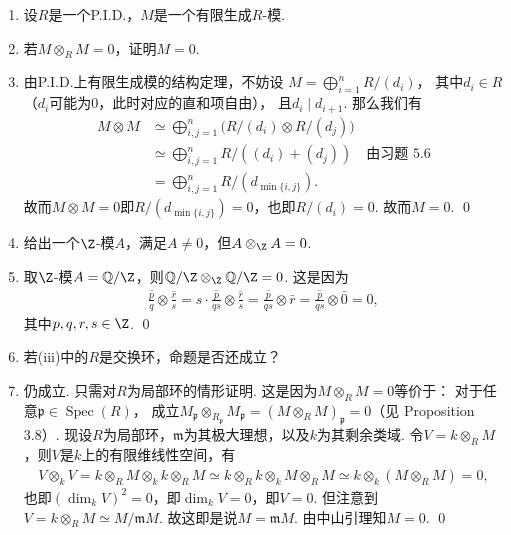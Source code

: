 \begin{enumerate}
    \item[5.3] 设$R$是一个P.I.D.，$M$是一个有限生成$R$-模.
    \item[(i)]
        若$M \otimes_{R} M = 0$，证明$M=0$.
    \item[\textbf{证明:}]
        由P.I.D.上有限生成模的结构定理，不妨设
        $M = \bigoplus\limits_{i=1}^{n} R/(d_{i})$，
        其中$d_{i} \in R$（$d_{i}$可能为$0$，此时对应的直和项自由），
        且$d_{i} \mid d_{i+1}$. 那么我们有
        \[\begin{aligned}
            M \otimes M &\simeq \bigoplus_{i,j=1}^{n}
            \big(R/(d_{i}) \otimes R/(d_{j})\big)\\
            &\simeq \bigoplus_{i,j=1}^{n}R/((d_{i})+(d_{j})) \quad\text{由习题 5.6}\\
            &= \bigoplus_{i,j=1}^{n}R/(d_{\min\{i,j\}}).
        \end{aligned}\]
        故而$M \otimes M = 0$即$R/(d_{\min\{i,j\}}) = 0$，也即$R/(d_{i}) = 0$. 故而$M=0$. \qed
    \item[(ii)] 
        给出一个$\Z$-模$A$，满足$A \neq 0$，但$A \otimes_{\Z} A = 0$.
    \item[\textbf{证明:}]
        取$\Z$-模$A=\mathbb{Q}/\Z$，则$\mathbb{Q}/\Z \otimes_{\Z} \mathbb{Q}/\Z = 0$. 这是因为
            \begin{equation*}\begin{aligned}
            \overline{\frac{p}{q}} \otimes \overline{\frac{r}{s}} 
             = s\cdot\overline{\frac{p}{qs}}\otimes \overline{\frac{r}{s}} 
             = \overline{\frac{p}{qs}}\otimes \bar{r} 
             = \overline{\frac{p}{qs}}\otimes \bar{0} = 0,
            \end{aligned}\end{equation*}
        其中$p,q,r,s\in\Z$. \qed
    \item[(iii)] 若(iii)中的$R$是交换环，命题是否还成立？
    \item[\textbf{证明:}]
        仍成立. 只需对$R$为局部环的情形证明. 
        这是因为$M \otimes_{R} M = 0$等价于：
        对于任意$\mathfrak{p} \in \operatorname{Spec}(R)$，
        成立$M_{\mathfrak{p}} \otimes_{R_{\mathfrak{p}}} M_{\mathfrak{p}} 
        = (M \otimes_{R} M)_{\mathfrak{p}} = 0$（见\cite{AM} Proposition 3.8）.
        现设$R$为局部环，$\mathfrak{m}$为其极大理想，以及$k$为其剩余类域. 
        令$V = k \otimes_{R} M$，则$V$是$k$上的有限维线性空间，有
        \begin{align*}
            V \otimes_{k} V = k \otimes_{R} M \otimes_{k} k \otimes_{R} M 
            \simeq k \otimes_{R} k \otimes_{k} M \otimes_{R} M 
            \simeq k \otimes_{k} (M \otimes_{R} M) = 0,
        \end{align*}
        也即$(\dim_{k} V)^{2}=0$，即$\dim_{k} V = 0$，即$V=0$. 
        但注意到$V = k \otimes_{R} M \simeq M/\mathfrak{m}M$. 
        故这即是说$M=\mathfrak{m}M$. 由中山引理知$M=0$. \qed


\end{enumerate}
